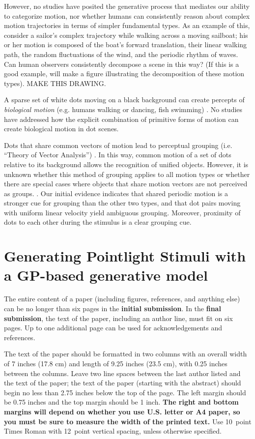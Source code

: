 \documentclass[10pt,letterpaper]{article}
\begin{document}
However, no studies have posited the generative process that mediates our ability to categorize motion, nor whether humans can consistently reason about complex motion trajectories in terms of simpler fundamental types. As an example of this, consider a sailor's complex trajectory while walking across a moving sailboat; his or her motion is composed of the boat's forward translation, their linear walking path, the random fluctuations of the wind, and the periodic rhythm of waves. Can human observers consistently decompose a scene in this way? (If this is a good example, will make a figure illustrating the decomposition of these motion types). MAKE THIS DRAWING. 

A sparse set of white dots moving on a black background can create percepts of \emph{biological motion} (e.g. humans walking or dancing, fish swimming) \cite{Johansson_1973}. No studies have addressed how the explicit combination of primitive forms of motion can create biological motion in dot scenes.  

Dots that share common vectors of motion lead to perceptual grouping (i.e. ``Theory of Vector Analysis'') \cite{Johansson_1973}. In this way, common motion of a set of dots relative to its background allows the recognition of unified objects. However, it is unknown whether this method of grouping applies to all motion types or whether there are special cases where objects that share motion vectors are not perceived as groups. \label{common_motion_phen}. Our initial evidence indicates that shared periodic motion is a stronger cue for grouping than the other two types, and that dot pairs moving with uniform linear velocity yield ambiguous grouping. Moreover, proximity of dots to each other during the stimulus is a clear grouping cue. 

\section{Generating Pointlight Stimuli with a GP-based generative model}

The entire content of a paper (including figures, references, and anything else) can be no longer than six pages in the \textbf{initial submission}. In the \textbf{final submission}, the text of the paper, including an author line, must fit on six pages. Up to one additional page can be used for acknowledgements and references.

The text of the paper should be formatted in two columns with an
overall width of 7 inches (17.8 cm) and length of 9.25 inches (23.5
cm), with 0.25 inches between the columns. Leave two line spaces
between the last author listed and the text of the paper; the text of
the paper (starting with the abstract) should begin no less than 2.75 inches below the top of the
page. The left margin should be 0.75 inches and the top margin should
be 1 inch.  \textbf{The right and bottom margins will depend on
  whether you use U.S. letter or A4 paper, so you must be sure to
  measure the width of the printed text.} Use 10~point Times Roman
with 12~point vertical spacing, unless otherwise specified.
\end{document}
